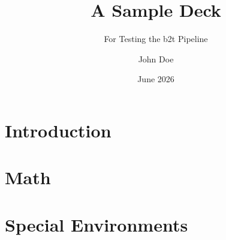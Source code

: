 \documentclass[aspectratio=169]{beamer}
\title{A Sample Deck}
\subtitle{For Testing the b2t Pipeline}
\author{John Doe}
\institute{University at Buffalo}
\date{June 2026}
\begin{document}
\begin{frame}
  \titlepage
\end{frame}

\begin{frame}
  \tableofcontents
\end{frame}


\section{Introduction}


\section{Math}


\section{Special Environments}




\appendix

\end{document}
